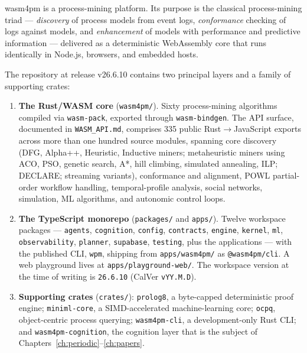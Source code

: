 \documentclass[11pt,oneside]{report}
\newcommand{\wpm}{\texttt{wpm}}
\newcommand{\projver}{v26.6.10}
\begin{document}
wasm4pm is a process-mining platform. Its purpose is the classical
process-mining triad --- \emph{discovery} of process models from event logs,
\emph{conformance} checking of logs against models, and \emph{enhancement}
of models with performance and predictive information
\cite{vdaalst2016} --- delivered as a deterministic WebAssembly core that
runs identically in Node.js, browsers, and embedded hosts.

The repository at release \projver{} contains two principal layers and a
family of supporting crates:

\begin{enumerate}
  \item \textbf{The Rust/WASM core} (\texttt{wasm4pm/}). Sixty
  process-mining algorithms compiled via \texttt{wasm-pack}, exported
  through \texttt{wasm-bindgen}. The API surface, documented in
  \texttt{WASM\_API.md}, comprises 335 public Rust$\to$JavaScript exports
  across more than one hundred source modules, spanning core discovery
  (DFG, Alpha++, Heuristic, Inductive miners; metaheuristic miners using
  ACO, PSO, genetic search, A*, hill climbing, simulated annealing, ILP;
  DECLARE; streaming variants), conformance and alignment, POWL
  partial-order workflow handling, temporal-profile analysis, social
  networks, simulation, ML algorithms, and autonomic control loops.

  \item \textbf{The TypeScript monorepo} (\texttt{packages/} and
  \texttt{apps/}). Twelve workspace packages ---
  \texttt{agents}, \texttt{cognition}, \texttt{config},
  \texttt{contracts}, \texttt{engine}, \texttt{kernel}, \texttt{ml},
  \texttt{observability}, \texttt{planner}, \texttt{supabase},
  \texttt{testing}, plus the applications --- with the published CLI,
  \wpm{}, shipping from \texttt{apps/wasm4pm/} as
  \texttt{@wasm4pm/cli}. A web playground lives at
  \texttt{apps/playground-web/}. The workspace version at the time of
  writing is \texttt{26.6.10} (CalVer \texttt{vYY.M.D}).

  \item \textbf{Supporting crates} (\texttt{crates/}):
  \texttt{prolog8}, a byte-capped deterministic proof engine;
  \texttt{miniml-core}, a SIMD-accelerated machine-learning core;
  \texttt{ocpq}, object-centric process querying; \texttt{wasm4pm-cli},
  a development-only Rust CLI; and \texttt{wasm4pm-cognition}, the
  cognition layer that is the subject of
  Chapters~\ref{ch:periodic}--\ref{ch:papers}.
\end{enumerate}
\end{document}
